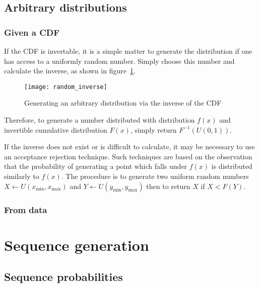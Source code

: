 \subsection{Arbitrary distributions}

\subsubsection{Given a CDF}
If the CDF is invertable, it is a simple matter to generate the distribution if one has access to a uniformly random number.
Simply choose this number and calculate the inverse, as shown in figure~\ref{fig:random_inverse}.

\begin{figure}[htbp]
  \centering
  \texttt{[image: random\_inverse]}
  \caption[Generating an arbitrary distribution via the inverse of the CDF]{Generating an arbitrary distribution via the inverse of the CDF \citep{saucier}}
  \label{fig:random_inverse}
\end{figure}

Therefore, to generate a number distributed with distribution $f(x)$ and invertible cumulative distribution $F(x)$, simply return $F^{-1}(U(0, 1))$.

If the inverse does not exist or is difficult to calculate, it may be necessary to use an acceptance rejection technique.
Such techniques are based on the observation that the probability of generating a point which falls under $f(x)$ is distributed similarly to $f(x)$.
The procedure is to generate two uniform random numbers $X \leftarrow U(x_{\min}, x_{\max})$ and $Y \leftarrow U(y_{\min}, y_{\max})$ then to return $X$ if $X<F(Y)$.

\subsubsection{From data}


\section{Sequence generation}
\subsection{Sequence probabilities}

